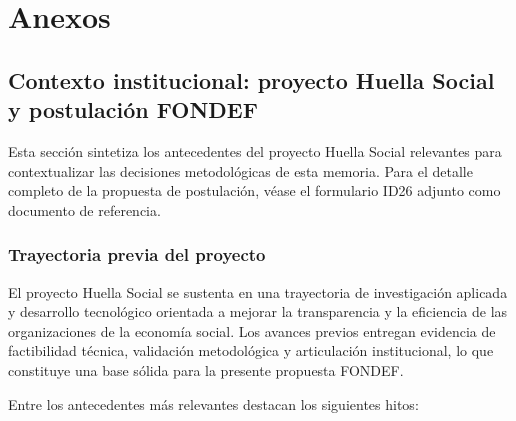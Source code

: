 
\chapter{Anexos}
\label{anx}
 
 
\section{Contexto institucional: proyecto Huella Social y postulación FONDEF}
\label{anx:fondef}
 
Esta sección sintetiza los antecedentes del proyecto Huella Social relevantes para contextualizar
las decisiones metodológicas de esta memoria. Para el detalle completo de la propuesta de
postulación, véase el formulario ID26 adjunto como documento de referencia.
 
\subsection{Trayectoria previa del proyecto}
\label{anx:A.1.1}
 
El proyecto Huella Social se sustenta en una trayectoria de investigación aplicada y desarrollo
tecnológico orientada a mejorar la transparencia y la eficiencia de las organizaciones de la
economía social. Los avances previos entregan evidencia de factibilidad técnica, validación
metodológica y articulación institucional, lo que constituye una base sólida para la presente
propuesta FONDEF.
 
Entre los antecedentes más relevantes destacan los siguientes hitos:
 
